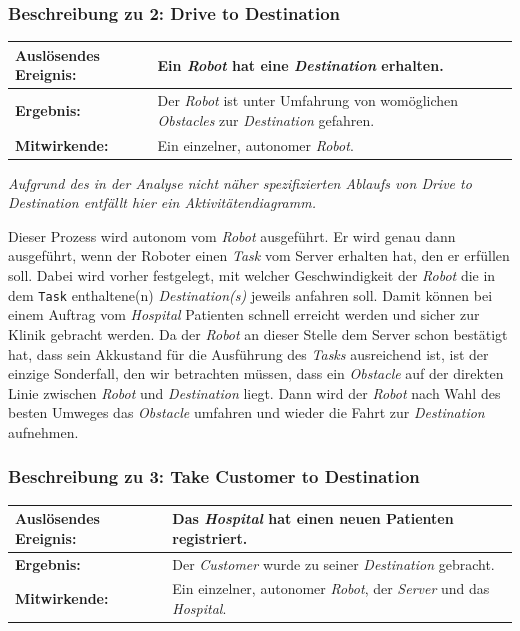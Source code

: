 			\subsubsection{Beschreibung zu 2: Drive to Destination}

			\begin{table}[H]
				\centering
				\begin{tabularx}{\textwidth}{|p{3cm}|X|}
				\hline
				\textbf{Auslösendes Ereignis:} & Ein \emph{Robot} hat eine \emph{Destination} erhalten.\\ \hline
				\textbf{Ergebnis:} & Der \emph{Robot} ist unter Umfahrung von womöglichen \emph{Obstacles} zur \emph{Destination} gefahren.\\ \hline
				\textbf{Mitwirkende:} &	Ein einzelner, autonomer \emph{Robot}. \\
				\hline
				\end{tabularx}
				\label{tab:2-4-drive-to-destination}
			\end{table}
			
			\emph{Aufgrund des in der Analyse nicht näher spezifizierten Ablaufs von \emph{Drive to Destination} 
			entfällt hier ein Aktivitätendiagramm.}

			Dieser Prozess wird autonom vom \emph{Robot} ausgeführt. 
			Er wird genau dann ausgeführt, wenn der Roboter einen \emph{Task} vom Server erhalten hat, den er erfüllen soll. 
			Dabei wird vorher festgelegt, mit welcher Geschwindigkeit der \emph{Robot} die in dem \texttt{Task} enthaltene(n) \emph{Destination(s)} jeweils anfahren soll. 
			Damit können bei einem Auftrag vom \emph{Hospital} Patienten schnell erreicht werden und sicher zur Klinik gebracht werden. 
			Da der \emph{Robot} an dieser Stelle dem Server schon bestätigt hat, dass sein Akkustand für die Ausführung des \emph{Tasks} ausreichend ist, 
			ist der einzige Sonderfall, den wir betrachten müssen, dass ein \emph{Obstacle} auf der direkten Linie zwischen \emph{Robot} und \emph{Destination} liegt. 
			Dann wird der \emph{Robot} nach Wahl des besten Umweges das \emph{Obstacle} umfahren und wieder die Fahrt zur \emph{Destination} aufnehmen.

			\subsubsection{Beschreibung zu 3: Take Customer to Destination}

			\begin{table}[H]
				\centering
				\begin{tabularx}{\textwidth}{|p{3cm}|X|}
				\hline
				\textbf{Auslösendes Ereignis:} & Das \emph{Hospital} hat einen neuen Patienten registriert.\\ \hline
				\textbf{Ergebnis:} & Der \emph{Customer} wurde zu seiner \emph{Destination} gebracht.\\ \hline
				\textbf{Mitwirkende:} &	Ein einzelner, autonomer \emph{Robot}, der \emph{Server} und das \emph{Hospital}. \\
				\hline
				\end{tabularx}
				\label{tab:2-4-take-customer-to-destination}
			\end{table}

